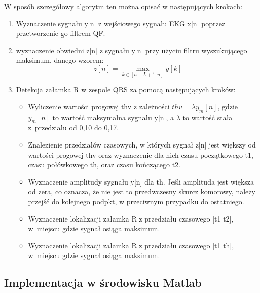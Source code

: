\documentclass[10pt,a4paper]{article}
\begin{document}
W sposób szczegółowy algorytm ten można opisać w następujących krokach:
\begin{enumerate}
\item Wyznaczenie sygnału y[n] z wejściowego sygnału EKG x[n] poprzez przetworzenie go filtrem QF.
\item wyznaczenie obwiedni z[n] z sygnału y[n] przy użyciu filtru wyszukującego maksimum, danego wzorem:
\begin{equation}
\label{QF11 - obwiednia}
z[n]= \max_{k\in [n-L+1,n]}y[k]
\end{equation}
\item Detekcja załamka R w zespole QRS za pomocą następujących kroków:
\begin{itemize}
\item Wyliczenie wartości progowej thv z zależności \begin{math}thv=\lambda y_m[n]\end{math}, gdzie \begin{math}y_m[n]\end{math} to wartość maksymalna sygnału y[n], a  \begin{math}\lambda\end{math} to wartość stała z~przedziału od 0,10 do 0,17.
\item Znalezienie przedziałów czasowych, w których sygnał z[n] jest większy od wartości progowej thv oraz wyznaczenie dla nich czasu początkowego t1, czasu połówkowego th, oraz czasu kończącego t2.
\item Wyznaczenie amplitudy sygnału y[n] dla th. Jeśli amplituda jest większa od zera, co oznacza, że nie jest to przedwczesny skurcz komorowy, należy przejść do kolejnego podpkt, w przeciwnym przypadku do ostatniego.
\item Wyznaczenie lokalizacji załamka R z przedziału czasowego [t1 t2], w~miejscu gdzie sygnał osiąga maksimum.
\item Wyznaczenie lokalizacji załamka R z przedziału czasowego [t1 th], w~miejscu gdzie sygnał osiąga maksimum.
\end{itemize}
\end{enumerate}

\newpage
\subsection{Implementacja w środowisku Matlab}
\bigskip
\end{document}

